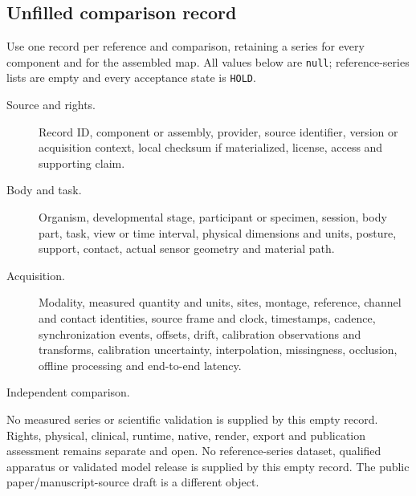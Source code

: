 \subsection*{Unfilled comparison record}

Use one record per reference and comparison, retaining a series for every
component and for the assembled map. All values below are \texttt{null};
reference-series lists are empty and every acceptance state is \texttt{HOLD}.

\begin{description}
\item[Source and rights.] Record ID, component or assembly, provider, source
identifier, version or acquisition context, local checksum if materialized,
license, access and supporting claim.
\item[Body and task.] Organism, developmental stage, participant or specimen,
session, body part, task, view or time interval, physical dimensions and units,
posture, support, contact, actual sensor geometry and material path.
\item[Acquisition.] Modality, measured quantity and units, sites, montage,
reference, channel and contact identities, source frame and clock, timestamps,
cadence, synchronization events, offsets, drift, calibration observations and
transforms, calibration uncertainty, interpolation, missingness, occlusion,
offline processing and end-to-end latency.
\item[Independent comparison.]
\end{description}

No measured series or scientific validation is supplied by this empty record.
Rights, physical, clinical, runtime, native, render, export and publication
assessment remains separate and open. No reference-series dataset, qualified apparatus or validated model release is supplied by this empty record. The public paper/manuscript-source draft is a different object.
